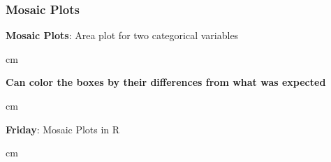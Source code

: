 \documentclass{beamer} %
\begin{document}
\begin{frame}\frametitle{Mosaic Plots}
	\small
	
	\textbf{Mosaic Plots}:  Area plot for two categorical variables%
	
	 cm
	
	\textbf{Can color the boxes by their differences from what was expected}  %
	
	 cm
	
	\textbf{Friday}:  Mosaic Plots in R%
	
	 cm
	
\end{frame}
\end{document}
